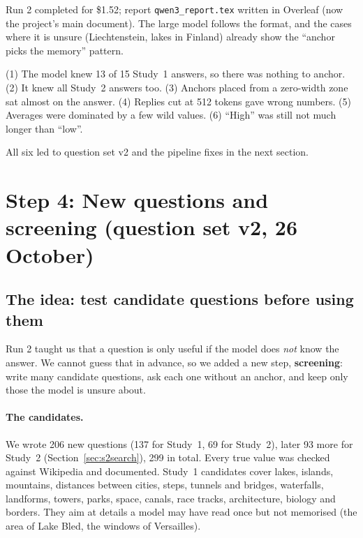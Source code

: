 \documentclass[11pt,a4paper]{article}
\newcommand{\dpn}[3]{%
\begin{tcolorbox}[breakable, colback=white, colframe=trline, boxrule=0.4pt, arc=0pt, left=6pt, right=6pt, top=4pt, bottom=4pt, before skip=10pt, after skip=10pt]
\small
\noindent{\color{donecol}\textsf{\textbf{DONE}}}\quad #1\par\medskip
\noindent{\color{probcol}\textsf{\textbf{PROBLEM}}}\quad #2\par\medskip
\noindent{\color{nextcol}\textsf{\textbf{WHAT WE DID / DO NEXT}}}\quad #3
\end{tcolorbox}}
\begin{document}
\dpn{Run 2 completed for \$1.52; report \texttt{qwen3\_report.tex} written in Overleaf (now the project's main document). The large model follows the format, and the cases where it is unsure (Liechtenstein, lakes in Finland) already show the ``anchor picks the memory'' pattern.}
{(1) The model knew 13 of 15 Study~1 answers, so there was nothing to anchor. (2) It knew all Study~2 answers too. (3) Anchors placed from a zero-width zone sat almost on the answer. (4) Replies cut at 512 tokens gave wrong numbers. (5) Averages were dominated by a few wild values. (6) ``High'' was still not much longer than ``low''.}
{All six led to question set v2 and the pipeline fixes in the next section.}

\section{Step 4: New questions and screening (question set v2, 26 October)}
\label{sec:v2}

\subsection{The idea: test candidate questions before using them}

Run 2 taught us that a question is only useful if the model does \emph{not} know the answer. We cannot guess that in advance, so we added a new step, \textbf{screening}: write many candidate questions, ask each one without an anchor, and keep only those the model is unsure about.

\paragraph{The candidates.} We wrote 206 new questions (137 for Study~1, 69 for Study~2), later 93 more for Study~2 (Section~\ref{sec:s2search}), 299 in total. Every true value was checked against Wikipedia and documented. Study~1 candidates cover lakes, islands, mountains, distances between cities, steps, tunnels and bridges, waterfalls, landforms, towers, parks, space, canals, race tracks, architecture, biology and borders. They aim at details a model may have read once but not memorised (the area of Lake Bled, the windows of Versailles).
\end{document}
